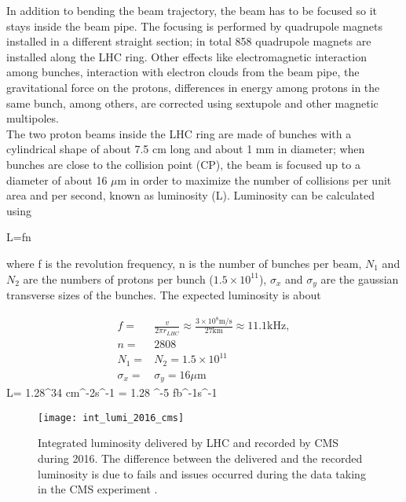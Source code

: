 \noindent In addition to bending the beam trajectory, the beam has to be focused so it stays inside the beam pipe. The focusing is performed by quadrupole magnets installed in a different straight section; in total 858 quadrupole magnets are installed along the LHC ring. Other effects like electromagnetic interaction among bunches, interaction with electron clouds from the beam pipe, the gravitational force on the protons, differences in energy among protons in the same bunch, among others, are corrected using sextupole and other magnetic multipoles.\\

\noindent The two proton beams inside the LHC ring are made of bunches with a cylindrical shape of about 7.5 cm long and about 1 mm in diameter; when bunches are close to the collision point (CP), the beam is focused up to a diameter of about 16 $\mu$m in order to maximize the number of collisions per unit area and per second, known as luminosity (L). Luminosity can be calculated using

\beqn
L=fn\label{eq:lumi}
\eeqn

\noindent where f is the revolution frequency, n is the number of bunches per beam,  $N_1$ and $N_2$ are the numbers of protons per bunch ($1.5\times 10^{11}$),  $\sigma_x$ and $\sigma_y$ are the gaussian transverse sizes of the bunches. The expected luminosity is about  

\begin{align}
  f=&\frac{v}{2\pi r_{LHC}}\approx\frac{3\times10^8\textrm{m/s}}{27\textrm{km}}\approx 11.1 \textrm{kHz},\nonumber \\
  n=&2808\nonumber \\ 
  N_1=&N_2=1.5\times 10^{11}\nonumber\\
  \sigma_x=&\sigma_y=16\mu \textrm{m}\nonumber
\end{align}
\beqn
L= 1.28^{34} \textrm{cm}^{-2}\textrm{s}^{-1} = 1.28 ^{-5} \textrm{fb}^{-1}\textrm{s}^{-1}
\eeqn

\begin{figure}[!h]
\centering
\texttt{[image: int\_lumi\_2016\_cms]}
\caption [Integrated luminosity delivered by LHC and recorded by CMS during 2016]{Integrated luminosity delivered by LHC and recorded by CMS during 2016. The difference between the delivered and the recorded luminosity is due to fails and issues occurred during the data taking in the CMS experiment \cite{lumi}.}\label{fig:lumi}
\end{figure}

